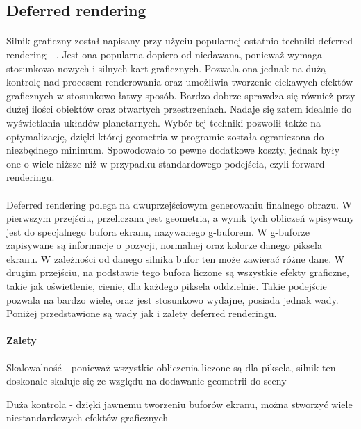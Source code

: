 \subsection{Deferred rendering}\label{sub:deferred rendering}
\paragraph{}

Silnik graficzny został napisany przy użyciu popularnej ostatnio techniki deferred rendering~\cite{gpugems:deferred}~\cite{calver:deferred}. Jest ona popularna dopiero od niedawana, ponieważ wymaga stosunkowo nowych i silnych kart graficznych. Pozwala ona jednak na dużą kontrolę nad procesem renderowania oraz umożliwia tworzenie ciekawych efektów graficznych w stosunkowo łatwy sposób. Bardzo dobrze sprawdza się również przy dużej ilości obiektów oraz otwartych przestrzeniach. Nadaje się zatem idealnie do wyświetlania układów planetarnych. Wybór tej techniki pozwolił także na optymalizację, dzięki której geometria w programie została ograniczona do niezbędnego minimum. Spowodowało to pewne dodatkowe koszty, jednak były one o wiele niższe niż w przypadku standardowego podejścia, czyli forward renderingu.

\paragraph{}

Deferred rendering polega na dwuprzejściowym generowaniu finalnego obrazu. W pierwszym przejściu, przeliczana jest geometria, a wynik tych obliczeń wpisywany jest do specjalnego bufora ekranu, nazywanego g-buforem. W g-buforze zapisywane są informacje o pozycji, normalnej oraz kolorze danego piksela ekranu. W zależności od danego silnika bufor ten może zawierać różne dane. W drugim przejściu, na podstawie tego bufora liczone są wszystkie efekty graficzne, takie jak oświetlenie, cienie, dla każdego piksela oddzielnie. Takie podejście pozwala na bardzo wiele, oraz jest stosunkowo wydajne, posiada jednak wady. Poniżej przedstawione są wady jak i zalety deferred renderingu.

\paragraph{Zalety}

\begin{description}
\item{Skalowalność} - ponieważ wszystkie obliczenia liczone są dla piksela, silnik ten doskonale skaluje się ze względu na dodawanie geometrii do sceny
\item{Duża kontrola} - dzięki jawnemu tworzeniu buforów ekranu, można stworzyć wiele niestandardowych efektów graficznych
\end{description}

